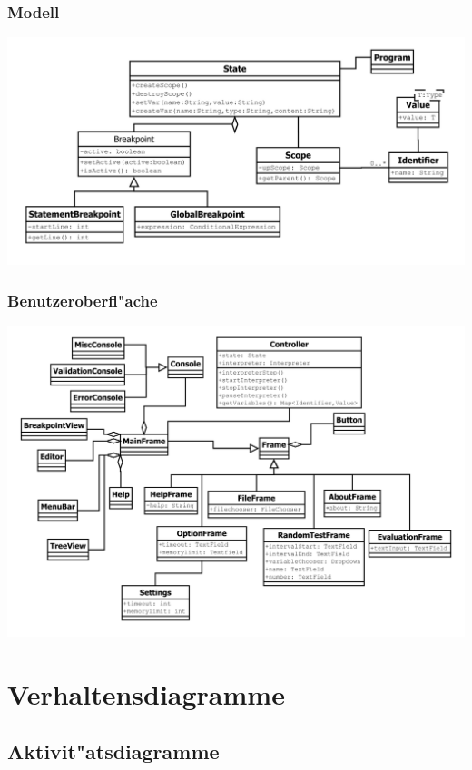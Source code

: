 \documentclass[10pt,a4paper,titlepage]{article}
\begin{document}
\subsubsection{Modell}
\includegraphics[scale=0.8]{images/Modell.pdf}
\subsubsection{Benutzeroberfl"ache}
\includegraphics[scale=0.85]{images/GUI.pdf}

\section{Verhaltensdiagramme}
\subsection{Aktivit"atsdiagramme}
\end{document}
